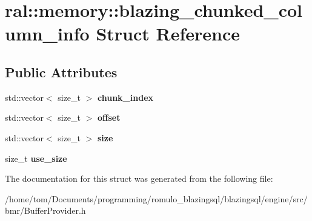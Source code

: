 \hypertarget{structral_1_1memory_1_1blazing__chunked__column__info}{}\section{ral\+:\+:memory\+:\+:blazing\+\_\+chunked\+\_\+column\+\_\+info Struct Reference}
\label{structral_1_1memory_1_1blazing__chunked__column__info}
\subsection*{Public Attributes}
\begin{DoxyCompactItemize}
\item 
\mbox{\label{structral_1_1memory_1_1blazing__chunked__column__info_ade2e424a1a7c456e8603d28b3354cab0}} 
std\+::vector$<$ size\+\_\+t $>$ {\bfseries chunk\+\_\+index}
\item 
\mbox{\label{structral_1_1memory_1_1blazing__chunked__column__info_a1899b994a49489806365c8bb1c3bd701}} 
std\+::vector$<$ size\+\_\+t $>$ {\bfseries offset}
\item 
\mbox{\label{structral_1_1memory_1_1blazing__chunked__column__info_a42595677fc4a89a91b5035d6a8a33d42}} 
std\+::vector$<$ size\+\_\+t $>$ {\bfseries size}
\item 
\mbox{\label{structral_1_1memory_1_1blazing__chunked__column__info_ab8efe7deb95e366b9343799ea26bd8c2}} 
size\+\_\+t {\bfseries use\+\_\+size}
\end{DoxyCompactItemize}


The documentation for this struct was generated from the following file\+:\begin{DoxyCompactItemize}
\item 
/home/tom/\+Documents/programming/romulo\+\_\+blazingsql/blazingsql/engine/src/bmr/Buffer\+Provider.\+h\end{DoxyCompactItemize}
